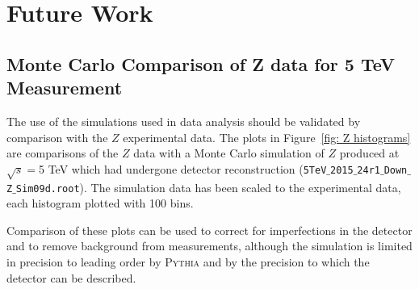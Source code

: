 \documentclass[a4paper]{article}
\begin{document}
\section{Future Work}
\subsection{Monte Carlo Comparison of Z data for 5 TeV Measurement} \label{Z histograms}
The use of the simulations used in data analysis should be validated by comparison with the $Z$ experimental data. 
The plots in Figure~\ref{fig: Z histograms} are comparisons of the $Z$ data with a Monte Carlo simulation of $Z$ produced at $\sqrt{s}=$5 TeV which had undergone detector reconstruction (\texttt{5TeV$\_$2015$\_$24r1$\_$Down$\_$Z$\_$Sim09d.root}). 
The simulation data has been scaled to the experimental data, each histogram plotted with 100 bins. 

Comparison of these plots can be used to correct for imperfections in the detector and to remove background from measurements, although the simulation is limited in precision to leading order by \textsc{Pythia} and by the precision to which the detector can be described.
\end{document}
